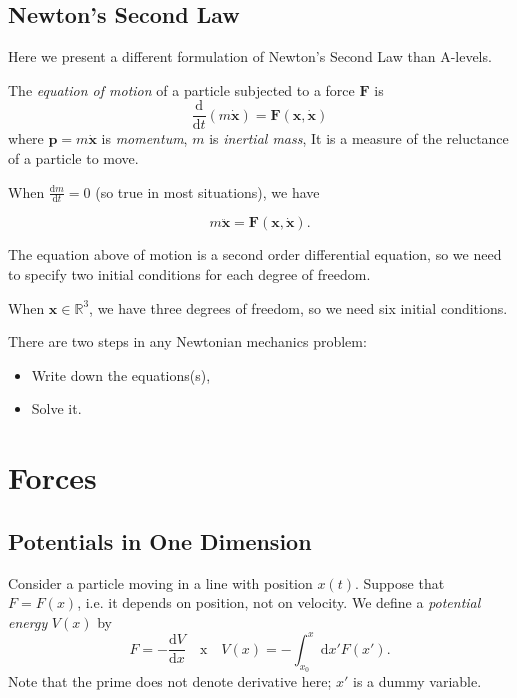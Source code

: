 \subsection{Newton's Second Law}
Here we present a different formulation of Newton's Second Law than A-levels.

\begin{definition}
    The \textit{equation of motion} of a particle subjected to a force \(\mathbf{F} \) is
    \[
        \frac{\mathrm{d}}{\mathrm{d}t} (m \dot{\mathbf{x}}) = \mathbf{F} (\mathbf{x}, \dot{\mathbf{x}})
    \]
    where \(\mathbf{p} = m \dot{\mathbf{x}}\) is \textit{momentum}, \(m\) is \textit{inertial mass}, It is a measure of the reluctance of a particle to move.
\end{definition}

When \(\frac{\mathrm{d}m}{\mathrm{d}t} = 0\) (so true in most situations), we have
\begin{theorem}
    \[
        m\ddot{\mathbf{x}} = \mathbf{F} (\mathbf{x}, \dot{\mathbf{x}}).
    \]
\end{theorem}
The equation above of motion is a second order differential equation, so we need to specify two initial conditions for each degree of freedom.

\begin{eg}
    When \(\mathbf{x} \in \mathbb{R}^3\), we have three degrees of freedom, so we need six initial conditions. 
\end{eg}

There are two steps in any Newtonian mechanics problem:
\begin{itemize}
    \item Write down the equations(s),
    \item Solve it.
\end{itemize}

\section{Forces}
\subsection{Potentials in One Dimension}
Consider a particle moving in a line with position \(x(t)\). Suppose that \(F = F(x)\), i.e. it depends on position, not on velocity. We define a \textit{potential energy} \(V(x)\) by
\[
    F = -\frac{\mathrm{d}V}{\mathrm{d}x} \quad \text{x} \quad V(x) = - \int_{x_0}^{x}\mathrm{d}x'F(x').
\]
Note that the prime does not denote derivative here; \(x'\) is a dummy variable.

